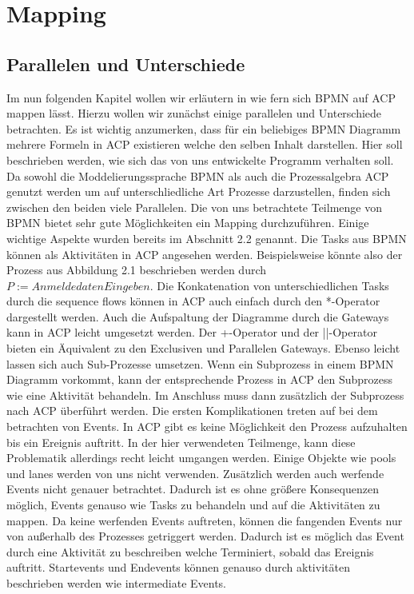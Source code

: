 
\chapter{Mapping} %

\label{Chapter3} %


\section{Parallelen und Unterschiede}\label{Parallelen und Unterschiede}
Im nun folgenden Kapitel wollen wir erläutern in wie fern sich BPMN auf ACP mappen lässt. Hierzu wollen wir zunächst einige parallelen und Unterschiede betrachten. Es ist wichtig anzumerken, dass für ein beliebiges BPMN Diagramm mehrere Formeln in ACP existieren welche den selben Inhalt darstellen. Hier soll beschrieben werden, wie sich das von uns entwickelte Programm verhalten soll.\\
Da sowohl die Moddelierungssprache BPMN als auch die Prozessalgebra ACP genutzt werden um auf unterschliedliche Art Prozesse darzustellen, finden sich zwischen den beiden viele Parallelen. Die von uns betrachtete Teilmenge von BPMN bietet sehr gute Möglichkeiten ein Mapping durchzuführen. Einige wichtige Aspekte wurden bereits im Abschnitt 2.2 genannt. Die Tasks aus BPMN können als Aktivitäten in ACP angesehen werden. Beispielsweise könnte also der Prozess aus Abbildung 2.1 beschrieben werden durch $P:=AnmeldedatenEingeben.$ Die Konkatenation von unterschiedlichen Tasks durch die sequence flows können in ACP auch einfach durch den *-Operator dargestellt werden. Auch die Aufspaltung der Diagramme durch die Gateways kann in ACP leicht umgesetzt werden. Der +-Operator und der ||-Operator bieten ein Äquivalent zu den Exclusiven und Parallelen Gateways. Ebenso leicht lassen sich auch Sub-Prozesse umsetzen. Wenn ein Subprozess in einem BPMN Diagramm vorkommt, kann der entsprechende Prozess in ACP den Subprozess wie eine Aktivität behandeln. Im Anschluss muss dann zusätzlich der Subprozess nach ACP überführt werden.
Die ersten Komplikationen treten auf bei dem betrachten von Events. In ACP gibt es keine Möglichkeit den Prozess aufzuhalten bis ein Ereignis auftritt. In der hier verwendeten Teilmenge, kann diese Problematik allerdings recht leicht umgangen werden. Einige Objekte wie pools und lanes werden von uns nicht verwenden. Zusätzlich werden auch werfende Events nicht genauer betrachtet. Dadurch ist es ohne größere Konsequenzen möglich, Events genauso wie Tasks zu behandeln und auf die Aktivitäten zu mappen. Da keine werfenden Events auftreten, können die fangenden Events nur von außerhalb des Prozesses getriggert werden. Dadurch ist es möglich das Event durch eine Aktivität zu beschreiben welche Terminiert, sobald das Ereignis auftritt. Startevents und Endevents können genauso durch aktivitäten beschrieben werden wie intermediate Events. \\
